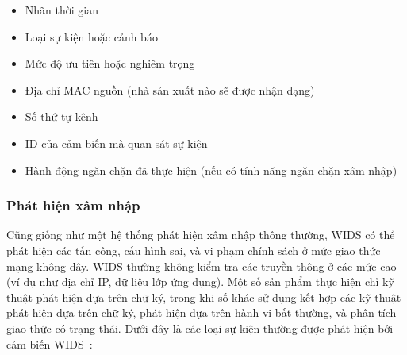 \begin{itemize}
\item Nhãn thời gian
\item Loại sự kiện hoặc cảnh báo
\item Mức độ ưu tiên hoặc nghiêm trọng
\item Địa chỉ MAC nguồn (nhà sản xuất nào sẽ được nhận dạng)
\item Số thứ tự kênh
\item ID của cảm biến mà quan sát sự kiện
\item Hành động ngăn chặn đã thực hiện (nếu có tính năng ngăn chặn xâm nhập)
\end{itemize}

\subsubsection{Phát hiện xâm nhập}
Cũng giống như một hệ thống phát hiện xâm nhập thông thường, WIDS có thể phát hiện các tấn công, cấu hình sai, và vi phạm chính sách ở mức giao thức mạng không dây. WIDS thường không kiểm tra các truyền thông ở các mức cao (ví dụ như địa chỉ IP, dữ liệu lớp ứng dụng). Một số sản phẩm thực hiện chỉ kỹ thuật phát hiện dựa trên chữ ký, trong khi số khác sử dụng kết hợp các kỹ thuật phát hiện dựa trên chữ ký, phát hiện dựa trên hành vi bất thường, và phân tích giao thức có trạng thái. Dưới đây là các loại sự kiện thường được phát hiện bởi cảm biến WIDS~\cite{scarfone2007guide}:

